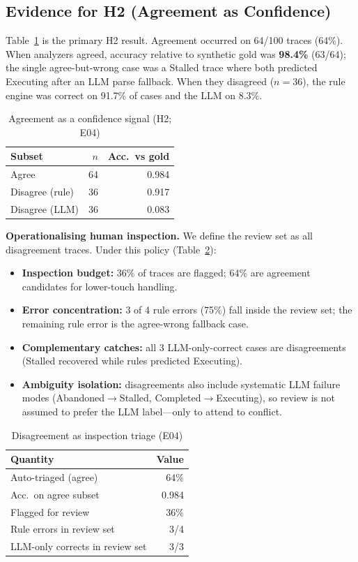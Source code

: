 \documentclass[conference]{IEEEtran}
\begin{document}
\subsection{Evidence for H2 (Agreement as Confidence)}
\label{sec:h2}

Table~\ref{tab:agree} is the primary H2 result. Agreement occurred on 64/100 traces
(64\%). When analyzers agreed, accuracy relative to synthetic gold was \textbf{98.4\%}
(63/64); the single agree-but-wrong case was a Stalled trace where both predicted
Executing after an LLM parse fallback. When they disagreed ($n{=}36$), the rule engine was
correct on 91.7\% of cases and the LLM on 8.3\%.

\begin{table}[H]
\caption{Agreement as a confidence signal (H2; E04)}
\label{tab:agree}
\centering
\small
\begin{tabular}{@{}lrr@{}}
\toprule
Subset & $n$ & Acc.\ vs gold \\ \midrule
Agree & 64 & 0.984 \\
Disagree (rule) & 36 & 0.917 \\
Disagree (LLM) & 36 & 0.083 \\ \bottomrule
\end{tabular}
\end{table}

\textbf{Operationalising human inspection.} We define the review set as all disagreement
traces. Under this policy (Table~\ref{tab:inspect}):

\begin{itemize}
\item \textbf{Inspection budget:} 36\% of traces are flagged; 64\% are agreement
      candidates for lower-touch handling.
\item \textbf{Error concentration:} 3 of 4 rule errors (75\%) fall inside the review set;
      the remaining rule error is the agree-wrong fallback case.
\item \textbf{Complementary catches:} all 3 LLM-only-correct cases are disagreements
      (Stalled recovered while rules predicted Executing).
\item \textbf{Ambiguity isolation:} disagreements also include systematic LLM failure
      modes (Abandoned$\rightarrow$Stalled, Completed$\rightarrow$Executing), so review is
      not assumed to prefer the LLM label---only to attend to conflict.
\end{itemize}

\begin{table}[H]
\caption{Disagreement as inspection triage (E04)}
\label{tab:inspect}
\centering
\small
\begin{tabular}{@{}lr@{}}
\toprule
Quantity & Value \\ \midrule
Auto-triaged (agree) & 64\% \\
Acc.\ on agree subset & 0.984 \\
Flagged for review & 36\% \\
Rule errors in review set & 3/4 \\
LLM-only corrects in review set & 3/3 \\ \bottomrule
\end{tabular}
\end{table}
\end{document}
